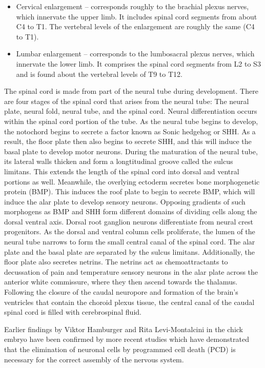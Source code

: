 \begin{itemize}
\tightlist
\item
  Cervical enlargement -- corresponds roughly to the brachial plexus nerves, which innervate the upper limb. It includes spinal cord segments from about C4 to T1. The vertebral levels of the enlargement are roughly the same (C4 to T1).
\item
  Lumbar enlargement -- corresponds to the lumbosacral plexus nerves, which innervate the lower limb. It comprises the spinal cord segments from L2 to S3 and is found about the vertebral levels of T9 to T12.
\end{itemize}

The spinal cord is made from part of the neural tube during development. There are four stages of the spinal cord that arises from the neural tube: The neural plate, neural fold, neural tube, and the spinal cord. Neural differentiation occurs within the spinal cord portion of the tube. As the neural tube begins to develop, the notochord begins to secrete a factor known as Sonic hedgehog or SHH. As a result, the floor plate then also begins to secrete SHH, and this will induce the basal plate to develop motor neurons. During the maturation of the neural tube, its lateral walls thicken and form a longtitudinal groove called the sulcus limitans. This extends the length of the spinal cord into dorsal and ventral portions as well. Meanwhile, the overlying ectoderm secretes bone morphogenetic protein (BMP). This induces the roof plate to begin to secrete BMP, which will induce the alar plate to develop sensory neurons. Opposing gradients of such morphogens as BMP and SHH form different domains of dividing cells along the dorsal ventral axis. Dorsal root ganglion neurons differentiate from neural crest progenitors. As the dorsal and ventral column cells proliferate, the lumen of the neural tube narrows to form the small central canal of the spinal cord. The alar plate and the basal plate are separated by the sulcus limitans. Additionally, the floor plate also secretes netrins. The netrins act as chemoattractants to decussation of pain and temperature sensory neurons in the alar plate across the anterior white commissure, where they then ascend towards the thalamus. Following the closure of the caudal neuropore and formation of the brain's ventricles that contain the choroid plexus tissue, the central canal of the caudal spinal cord is filled with cerebrospinal fluid.

Earlier findings by Viktor Hamburger and Rita Levi-Montalcini in the chick embryo have been confirmed by more recent studies which have demonstrated that the elimination of neuronal cells by programmed cell death (PCD) is necessary for the correct assembly of the nervous system.


